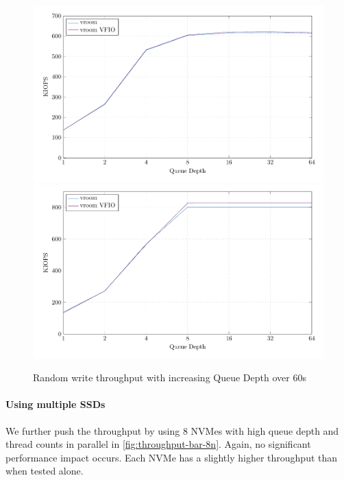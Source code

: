 \begin{figure}[H]
  \centering
   {\includegraphics[width=.8\textwidth]{figures/qdnt1_2MiB} \label{fig:qdnt1-2MiB-intel}}
   {\includegraphics[width=.8\textwidth]{figures/qdnt1_2MiB_epyc} \label{fig:qdnt1-2MiB-epyc}}
  \caption{Random write throughput with increasing Queue Depth over 60s}
  \label{fig:qdnt1-2MiB}
\end{figure}

\paragraph{Using multiple SSDs} We further push the throughput by using 8 NVMes with high queue depth and thread counts in parallel in \autoref{fig:throughput-bar-8n}. Again, no significant performance impact occurs. Each NVMe has a slightly higher throughput than when tested alone.


